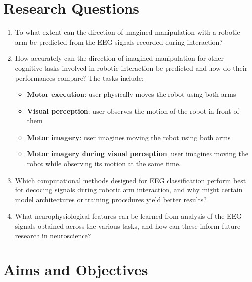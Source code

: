 \section{Research Questions}
\label{section:questions}
\bigskip


\begin{enumerate}
    \item To what extent can the direction of imagined manipulation with a robotic arm be predicted from the EEG signals recorded during interaction?
    \item How accurately can the direction of imagined manipulation for other cognitive tasks involved in robotic interaction be predicted and how do their performances compare? The tasks include:
    \begin{itemize}
        \item \textbf{Motor execution}: user physically moves the robot using both arms
        \item \textbf{Visual perception}: user observes the motion of the robot in front of them
        \item \textbf{Motor imagery}: user imagines moving the robot using both arms
        \item \textbf{Motor imagery during visual perception}: user imagines moving the robot while observing its motion at the same time.
    \end{itemize}
    \item Which computational methods designed for EEG classification perform best for decoding signals during robotic arm interaction, and why might certain model architectures or training procedures yield better results?
    \item What neurophysiological features can be learned from analysis of the EEG signals obtained across the various tasks, and how can these inform future research in neuroscience?
\end{enumerate}



\section{Aims and Objectives}
\label{section:Aims}
\bigskip

